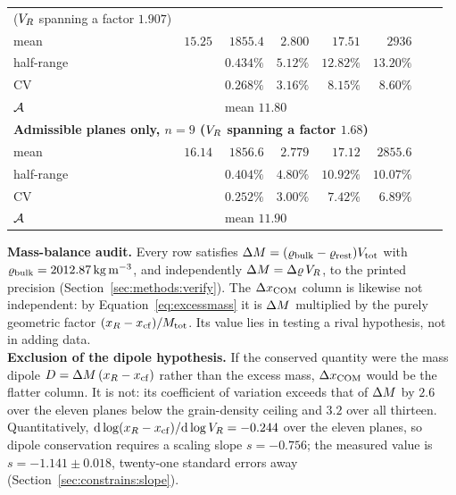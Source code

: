 \begin{table}[htbp]
\begin{tabular}{lrrrrrrr}
{ ($V_{R}$ spanning a factor $1.907$) %
 } \\
mean       & $15.25$ & $1855.4$ & $2.800$ & $17.51$ & $2936$ & & \\
half-range &         & $0.434\%$ & $5.12\%$ & $12.82\%$ & $13.20\%$ & & \\
CV         &         & $\mathbf{0.268\%}$ & $\mathbf{3.16\%}$
           & $\mathbf{8.15\%}$ & $8.60\%$ & & \\
$\mathcal{A}$  &         & \multicolumn{6}{l}{mean $11.80$} \\
\midrule
\multicolumn{8}{l}{\bfseries Admissible planes only, $n=9$\quad
 ($V_{R}$ spanning a factor $1.68$)} \\
mean       & $16.14$ & $1856.6$ & $2.779$ & $17.12$ & $2855.6$ & & \\
half-range &         & $0.404\%$ & $4.80\%$ & $10.92\%$ & $10.07\%$ & & \\
CV         &         & $\mathbf{0.252\%}$ & $\mathbf{3.00\%}$
           & $\mathbf{7.42\%}$ & $6.89\%$ & & \\
$\mathcal{A}$  &         & \multicolumn{6}{l}{mean $11.90$} \\
\bottomrule
\end{tabular}


\vspace{4pt}
\begin{minipage}{\textwidth}
\footnotesize
\textbf{Mass-balance audit.} Every row satisfies
$\Delta M = (\varrho_{\mathrm{bulk}}-\varrho_{\mathrm{rest}})V_{\mathrm{tot}}$ with
$\varrho_{\mathrm{bulk}} = \SI{2012.87}{\kilo\gram\per\cubic\metre}$, and independently
$\Delta M = \Delta\varrho\,V_{R}$, to the printed precision
(Section~\ref{sec:methods:verify}). The $\Delta x_{\mathrm{COM}}$ column is likewise not
independent: by Equation~\eqref{eq:excessmass} it is $\Delta M$ multiplied
by the purely geometric factor $(x_R-x_{\mathrm{cf}})/M_{\mathrm{tot}}$. Its value
lies in testing a rival hypothesis, not in adding data.
\\[3pt]
\textbf{Exclusion of the dipole hypothesis.} If the conserved quantity
were the mass dipole $D = \Delta M\,(x_R-x_{\mathrm{cf}})$ rather than the
excess mass, $\Delta x_{\mathrm{COM}}$ would be the flatter column. It is not: its
coefficient of variation exceeds that of $\Delta M$ by $2.6$ over the
eleven planes below the grain-density ceiling and $3.2$ over all thirteen.
Quantitatively, $\mathrm{d}\log(x_R-x_{\mathrm{cf}})/\mathrm{d}\log V_{R} =
-0.244$ over the eleven planes, so dipole conservation requires a scaling
slope $s = -0.756$; the measured value is $s = -1.141 \pm 0.018$,
twenty-one standard errors away (Section~\ref{sec:constrains:slope}).
\end{minipage}
\end{table}

